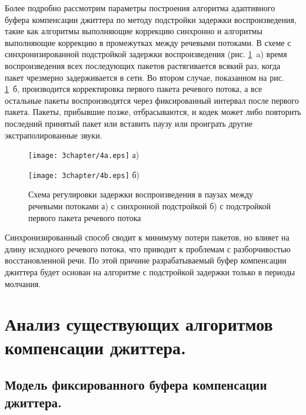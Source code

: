 Более подробно рассмотрим параметры построения алгоритма адаптивного буфера компенсации джиттера по методу подстройки задержки воспроизведения, такие как алгоритмы выполняющие коррекцию синхронно и алгоритмы выполняющие коррекцию в промежутках между речевыми потоками. 
В схеме с синхронизированной подстройкой задержки воспроизведения (рис. \ref{img3:manageDelay} a) время воспроизведения всех последующих пакетов растягивается всякий раз, когда пакет чрезмерно задерживается в сети. 
Во втором случае, показанном на рис. \ref{img3:manageDelay} б, производится корректировка первого пакета речевого потока, а все остальные пакеты воспроизводятся через фиксированный интервал после первого пакета. Пакеты, прибывшие позже, отбрасываются, и кодек может либо повторить последний принятый пакет или вставить паузу или проиграть другие экстраполированные звуки.


\begin{figure} [h]
\begin{minipage}[h]{0.85\linewidth}
\center
\texttt{[image: 3chapter/4a.eps]} а) \\
\end{minipage}
\vfill
\begin{minipage}[h]{0.95\linewidth}
\center
\texttt{[image: 3chapter/4b.eps]} б) \\
\end{minipage}
\caption{Схема регулировки задержки воспроизведения в паузах между речевыми потоками а) с синхронной подстройкой б) с подстройкой первого пакета речевого потока }
\label{img3:manageDelay}
\end{figure}


Синхронизированный способ сводит к минимуму потери пакетов, но влияет на длину исходного речевого потока, что приводит к проблемам с разборчивостью восстановленной речи. По этой причине разрабатываемый буфер компенсации джиттера будет основан на алгоритме с подстройкой задержки только в периоды молчания.


\section{Анализ существующих алгоритмов компенсации джиттера.} \label{sect3_4}
\subsection{Модель фиксированного буфера компенсации джиттера.} \label{sect3_4_1}

